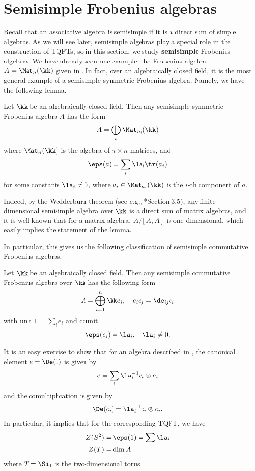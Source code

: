 \section{Semisimple Frobenius algebras}\label{s:frobenius-ss}

Recall that an associative algebra is semisimple if it is a direct sum of simple
algebras.  As we will see later, semisimple algebras play a special role in the
construction of TQFTs, so in this section, we study \textbf{semisimple}
Frobenius algebras. We have already seen one example: the Frobenius algebra
$A=\Mat_n(\kk)$ given in . In fact, over an algebraically
closed field, it is the most general example of a semisimple symmetric Frobenius
algebra. Namely, we have the following lemma.

\begin{lemma}\label{l:frobenius-ss}
  Let $\kk$ be an algebraically closed field.
  Then any semisimple symmetric Frobenius algebra $A$ has the form
  $$
    A=\bigoplus_i \Mat_{n_i}(\kk)
  $$
  where $\Mat_n(\kk)$ is the algebra of $n\times n$ matrices, and
  $$
  \eps(a)=\sum_i \la_i \tr(a_i)
  $$
  for some constants $\la_i\ne 0$, where $a_i\in\Mat_{n_i}(\kk)$ is the
  $i$-th component of $a$.
\end{lemma}
Indeed, by the Wedderburn theorem (see e.g., *{Section 3.5}), any
finite-dimensional semisimple algebra over $\kk$ is a direct sum of matrix
algebras, and it is well known that for a matrix algebra, $A/[A,A]$ is
one-dimensional, which easily implies the statement of the lemma.

In particular, this gives us the following classification
of semisimple commutative Frobenius algebras.

\begin{theorem}\label{t:frobenius_commutative}
  Let $\kk$ be an algebraically closed field. Then
  any semisimple commutative Frobenius algebra over $\kk$ has the following
  form
  $$
  A=\bigoplus_{i=1}^n \kk e_i, \quad e_ie_j=\de_{ij}e_i
  $$
  with unit $1=\sum_i e_i$ and counit
  $$
  \eps(e_i)=\la_i, \quad \la_i\ne 0.
  $$
\end{theorem}

It is an easy exercise to show that for an algebra described in
, the canonical element $e=\De(1)$ is given by
$$
e= \sum_i \la_i^{-1}e_i\otimes e_i
$$
and the comultiplication is given by
$$
\De(e_i)=\la_i^{-1}e_i\otimes e_i.
$$
In particular, it implies that for the corresponding TQFT, we have
\begin{align*}
  Z(S^2)&=\eps(1)=\sum \la_i\\
  Z(T)&=\dim A
\end{align*}
where $T=\Si_1$ is the two-dimensional torus.

